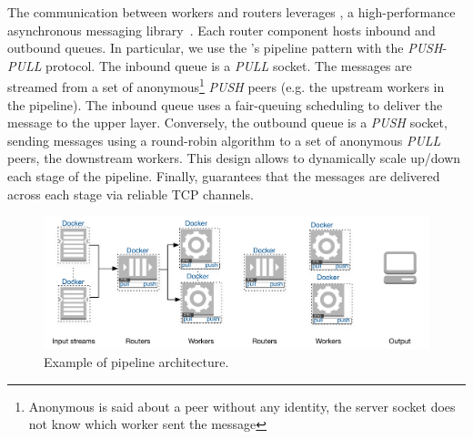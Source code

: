 The communication between workers and routers leverages \zmq, a high-performance asynchronous messaging library~\cite{zero_mq}.
Each router component hosts inbound and outbound queues. %
In particular, we use the \zmq's pipeline pattern with the \emph{PUSH}-\emph{PULL} protocol\cite{zero_mq:pipeline}.
The inbound queue is a \emph{PULL} socket.
The messages are streamed from a set of anonymous\footnote{Anonymous is said about a peer without any identity, the server socket does not know which worker sent the message} \emph{PUSH} peers (e.g. the upstream workers in the pipeline).
The inbound queue uses a fair-queuing scheduling to deliver the message to the upper layer.%
Conversely, the outbound queue is a \emph{PUSH} socket, sending messages using a round-robin algorithm to a set of anonymous \emph{PULL} peers, the downstream workers.
This design allows to dynamically scale up/down each stage of the pipeline. %
Finally, \zmq guarantees that the messages are delivered across each stage via reliable TCP channels.

\begin{figure}
  \centering
  \includegraphics[scale=0.7]{images/architecture_pipeline}
  \caption{Example of \SYS pipeline architecture.}
  \label{fig:architecture_pipeline}
\end{figure}
